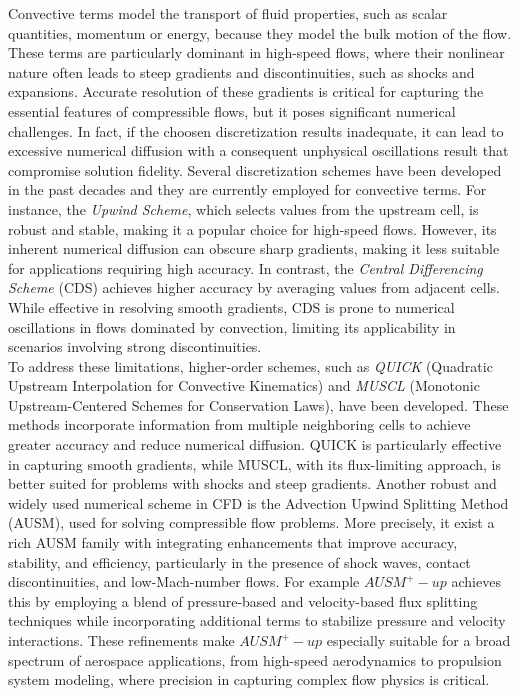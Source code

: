 \documentclass[a5paper]{sapthesis}
\begin{document}
	Convective terms model the transport of fluid properties, such as scalar quantities, momentum or energy, because they model the bulk motion of the flow. These terms are particularly dominant in high-speed flows, where their nonlinear nature often leads to steep gradients and discontinuities, such as shocks and expansions. Accurate resolution of these gradients is critical for capturing the essential features of compressible flows, but it poses significant numerical challenges. In fact, if the choosen discretization results inadequate, it can lead to excessive numerical diffusion with a consequent unphysical oscillations result that compromise solution fidelity.	 
	Several discretization schemes have been developed in the past decades and they are currently employed for convective terms. For instance, the \textit{Upwind Scheme}, which selects values from the upstream cell, is robust and stable, making it a popular choice for high-speed flows. However, its inherent numerical diffusion can obscure sharp gradients, making it less suitable for applications requiring high accuracy. In contrast, the \textit{Central Differencing Scheme} (CDS) achieves higher accuracy by averaging values from adjacent cells. While effective in resolving smooth gradients, CDS is prone to numerical oscillations in flows dominated by convection, limiting its applicability in scenarios involving strong discontinuities.
	\\
	To address these limitations, higher-order schemes, such as \textit{QUICK} (Quadratic Upstream Interpolation for Convective Kinematics)\cite{leonard1979stable} and \textit{MUSCL} (Monotonic Upstream-Centered Schemes for Conservation Laws)\cite{toro2013riemann}, have been developed. These methods incorporate information from multiple neighboring cells to achieve greater accuracy and reduce numerical diffusion. QUICK is particularly effective in capturing smooth gradients, while MUSCL, with its flux-limiting approach, is better suited for problems with shocks and steep gradients. Another robust and widely used  numerical scheme in CFD is the Advection Upwind Splitting Method (AUSM)\cite{LIOU_AUSM}, used for solving compressible flow problems. More precisely, it exist a rich AUSM family with  integrating enhancements that improve accuracy, stability, and efficiency, particularly in the presence of shock waves, contact discontinuities, and low-Mach-number flows. For example $AUSM^+-up$ achieves this by employing a blend of pressure-based and velocity-based flux splitting techniques while incorporating additional terms to stabilize pressure and velocity interactions. These refinements make $AUSM^+-up$ especially suitable for a broad spectrum of aerospace applications, from high-speed aerodynamics to propulsion system modeling, where precision in capturing complex flow physics is critical.
\end{document}
